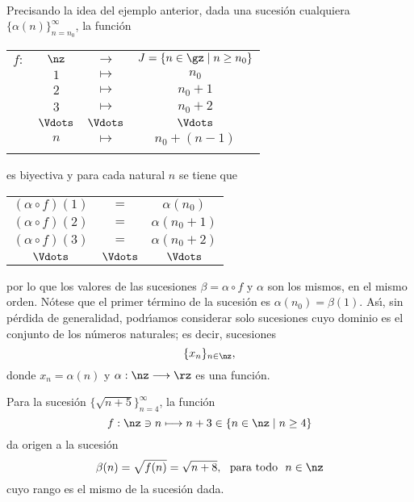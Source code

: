 \paragraph{}

Precisando la idea del ejemplo anterior, dada una sucesi\'{o}n cualquiera
$\{\alpha(n)\}_{n=n_{0}}^{\infty}$, la funci\'{o}n

\begin{center}
\begin{tabular}
[c]{cccc}%
$f:$ & $\nz$ & $\longrightarrow$ & $J=\{n\in\gz\mid n\geq n_{0}\}$\\
& $1$ & $\longmapsto$ & $n_{0}$\\
& $2$ & $\longmapsto$ & $n_{0}+1$\\
& $3$ & $\longmapsto$ & $n_{0}+2$\\
& $\Vdots$ & $\Vdots$ & $\Vdots$\\
& $n$ & $\longmapsto$ & $n_{0}+(n-1)$\\
&  &  &
\end{tabular}
\end{center}


es biyectiva y para cada natural $n$ se tiene que
\begin{center}
\begin{tabular}[c]{ccc}
$(\alpha\circ f)(1)$  & $ = $     &$\alpha(n_{0})$\\
$(\alpha\circ f)(2)$  & $ = $     &$\alpha(n_{0}+1)$\\
$(\alpha\circ f)(3)$  & $ = $     &$\alpha(n_{0}+2)$\\
$\Vdots            $  & $\Vdots$  &$ \Vdots$
\end{tabular}
\end{center}
por lo que los valores de las sucesiones $\beta=\alpha\circ f$ y $\alpha$ son
los mismos, en el mismo orden. N\'{o}tese que el primer t\'{e}rmino de la
sucesi\'{o}n es $\alpha(n_{0})=\beta(1)$. As\'{\i}, sin p\'{e}rdida de
generalidad, podr\'{\i}amos considerar solo sucesiones cuyo dominio es el
conjunto de los n\'{u}meros naturales; es decir, sucesiones
\[
\{x_{n}\}_{n\in\nz},
\]
donde $x_{n}=\alpha(n)$ y $\alpha:\nz\longrightarrow\rz$ es una funci\'{o}n.

\begin{example}
Para la sucesi\'{o}n $\{\sqrt{n+5}\}_{n=4}^{\infty}$, la funci\'{o}n
\[
f:\nz\ni n\longmapsto n+3\in\{n\in\nz\mid n\geq4\}
\]
da origen a la sucesi\'{o}n
\[
\beta(n)=\sqrt{f(n)}=\sqrt{n+8},\mbox{ \ para todo \
}n\in\nz
\]
cuyo rango es el mismo de la sucesi\'{o}n dada.
\end{example}

